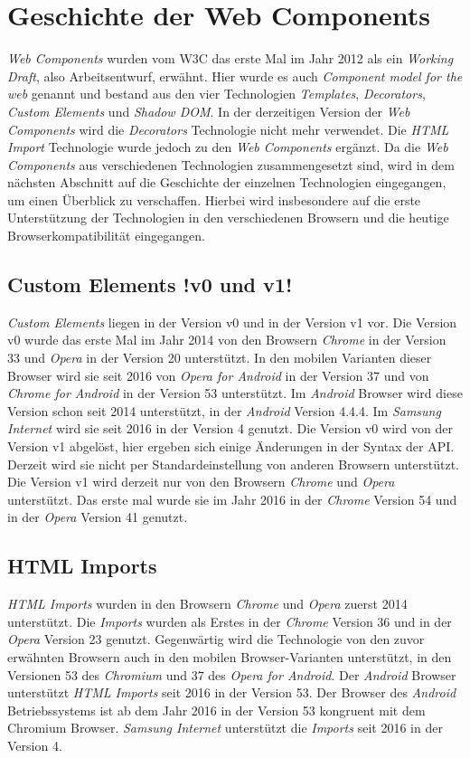 \documentclass[12pt, paper=a4, bibtotoc, toc=listof, headsepline=true]{scrreprt}
\begin{document}
	\section{Geschichte der Web Components}
	\label{ref:gesVonWebCom}
	\emph{Web Components} wurden vom \ac{W3C} das erste Mal im Jahr 2012 als ein \emph{Working Draft}, also Arbeitsentwurf, erwähnt. Hier wurde es auch \emph{Component model for the web} genannt und bestand aus den vier Technologien \emph{Templates}, \emph{Decorators}, \emph{Custom Elements} und \emph{Shadow DOM}. In der derzeitigen Version der \emph{Web Components} wird die \emph{Decorators} Technologie nicht mehr verwendet. Die \emph{\ac{HTML} Import} Technologie wurde jedoch zu den \emph{Web Components} ergänzt.\cite[vgl.]{Cooney2012} Da die \emph{Web Components} aus verschiedenen Technologien zusammengesetzt sind, wird in dem nächsten Abschnitt auf die Geschichte der einzelnen Technologien eingegangen, um einen Überblick zu verschaffen. Hierbei wird insbesondere auf die erste Unterstützung der Technologien in den verschiedenen Browsern und die heutige Browserkompatibilität eingegangen.
		\subsection{Custom Elements !v0 und v1!}
		\emph{Custom Elements} liegen in der Version v0 und in der Version v1 vor. Die Version v0 wurde das erste Mal im Jahr 2014 von den Browsern \emph{Chrome} in der Version 33 und \emph{Opera} in der Version 20 unterstützt. In den mobilen Varianten dieser Browser  wird sie seit 2016 von \emph{Opera for Android} in der Version 37 und von \emph{Chrome for Android} in der Version 53 unterstützt.\cite[vgl.]{C2015} Im \emph{Android} Browser wird diese Version schon seit 2014 unterstützt, in der \emph{Android} Version 4.4.4. Im \emph{Samsung Internet} wird sie seit 2016 in der Version 4 genutzt.\cite[vgl.]{cusEleCanIUse} Die Version v0 wird von der Version v1 abgelöst, hier ergeben sich einige Änderungen in der Syntax der \ac{API}.\cite[vgl.]{Bidelman2016cusElev1} Derzeit wird sie nicht per Standardeinstellung von anderen Browsern unterstützt.\cite[vgl.]{firefox} Die Version v1 wird derzeit nur von den Browsern \emph{Chrome} und \emph{Opera} unterstützt. Das erste mal wurde sie im Jahr 2016 in der \emph{Chrome} Version 54 und in der \emph{Opera} Version 41 genutzt. \cite[vgl.]{C2016}
		\subsection{HTML Imports}
		\emph{\ac{HTML} Imports} wurden in den Browsern \emph{Chrome} und \emph{Opera} zuerst 2014 unterstützt. Die \emph{Imports} wurden als Erstes in der \emph{Chrome} Version 36 und in der \emph{Opera} Version 23 genutzt. Gegenwärtig wird die Technologie von den zuvor erwähnten Browsern auch in den mobilen Browser-Varianten unterstützt, in den Versionen 53 des \emph{Chromium} und 37 des \emph{Opera for Android}.\cite[vgl.]{Morrita2015} Der \emph{Android} Browser unterstützt \emph{\ac{HTML} Imports} seit 2016 in der Version 53. Der Browser des \emph{Android} Betriebssystems ist ab dem Jahr 2016 in der Version 53 kongruent mit dem Chromium Browser. \emph{Samsung Internet} unterstützt die \emph{Imports} seit 2016 in der Version 4.\cite[vgl.]{htmlTemplCaniuse}
\end{document}
